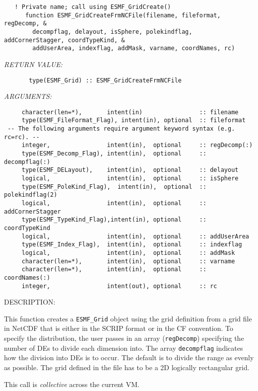  
\begin{verbatim}   ! Private name; call using ESMF_GridCreate()
      function ESMF_GridCreateFrmNCFile(filename, fileformat, regDecomp, &
        decompflag, delayout, isSphere, polekindflag, addCornerStagger, coordTypeKind, &
        addUserArea, indexflag, addMask, varname, coordNames, rc)
 \end{verbatim}{\em RETURN VALUE:}
\begin{verbatim}       type(ESMF_Grid) :: ESMF_GridCreateFrmNCFile\end{verbatim}{\em ARGUMENTS:}
\begin{verbatim} 
     character(len=*),       intent(in)                :: filename
     type(ESMF_FileFormat_Flag), intent(in), optional  :: fileformat
 -- The following arguments require argument keyword syntax (e.g. rc=rc). --
     integer,                intent(in),  optional     :: regDecomp(:)
     type(ESMF_Decomp_Flag), intent(in),  optional     :: decompflag(:)
     type(ESMF_DELayout),    intent(in),  optional     :: delayout
     logical,                intent(in),  optional     :: isSphere
     type(ESMF_PoleKind_Flag),  intent(in),  optional  :: polekindflag(2)
     logical,                intent(in),  optional     :: addCornerStagger 
     type(ESMF_TypeKind_Flag),intent(in), optional     :: coordTypeKind
     logical,                intent(in),  optional     :: addUserArea
     type(ESMF_Index_Flag),  intent(in),  optional     :: indexflag
     logical,                intent(in),  optional     :: addMask
     character(len=*),       intent(in),  optional     :: varname
     character(len=*),       intent(in),  optional     :: coordNames(:)
     integer,                intent(out), optional     :: rc
 \end{verbatim}
{\sf DESCRIPTION:\\ }


   This function creates a {\tt ESMF\_Grid} object using the grid definition from
   a grid file in NetCDF that is either in the SCRIP format or in the CF convention.
   To specify the distribution, the user passes in an array
   ({\tt regDecomp}) specifying the number of DEs to divide each
   dimension into. The array {\tt decompflag} indicates how the division into DEs is to
   occur.  The default is to divide the range as evenly as possible.
   The grid defined in the file has to be a 2D logically rectangular
   grid.
  
   This call is {\em collective} across the current VM.
  

